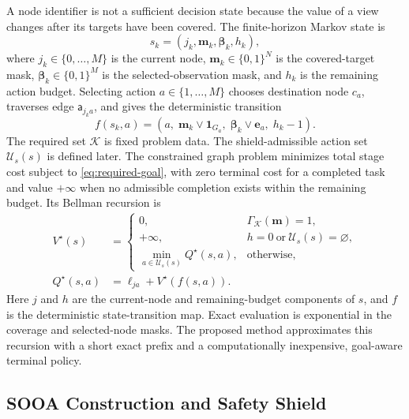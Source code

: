 \documentclass{IEEEtaes}
\begin{document}
A node identifier is not a sufficient decision state because the value of a view changes after its targets have been covered. The finite-horizon Markov state is
\begin{equation}
  s_k=(j_k,\mathbf m_k,\boldsymbol\beta_k,h_k),
  \label{eq:mdp-state}
\end{equation}
where $j_k\in\{0,\ldots,M\}$ is the current node, $\mathbf m_k\in\{0,1\}^{N}$ is the covered-target mask, $\boldsymbol\beta_k\in\{0,1\}^{M}$ is the selected-observation mask, and $h_k$ is the remaining action budget. Selecting action $a\in\{1,\ldots,M\}$ chooses destination node $c_a$, traverses edge $\mathsf a_{j_ka}$, and gives the deterministic transition
\begin{equation}
  f(s_k,a)=\left(a,\;\mathbf m_k\lor\mathbf 1_{G_a},\;\boldsymbol\beta_k\lor\mathbf e_a,\;h_k-1\right).
  \label{eq:mdp-transition}
\end{equation}
The required set $\mathcal K$ is fixed problem data. The shield-admissible action set $\mathcal U_s(s)$ is defined later. The constrained graph problem minimizes total stage cost subject to \eqref{eq:required-goal}, with zero terminal cost for a completed task and value $+\infty$ when no admissible completion exists within the remaining budget. Its Bellman recursion is
\begin{equation}
  \begin{aligned}
  V^\star(s)&=
    \begin{cases}
    0, & \Gamma_{\mathcal K}(\mathbf m)=1,\\
    +\infty, & h=0\ \text{or}\ \mathcal U_s(s)=\varnothing,\\
    \min\limits_{a\in\mathcal U_s(s)}
      Q^\star(s,a), & \text{otherwise},
    \end{cases}\\
  Q^\star(s,a)&=\ell_{ja}+V^\star(f(s,a)).
  \end{aligned}
  \label{eq:bellman}
\end{equation}
Here $j$ and $h$ are the current-node and remaining-budget components of $s$, and $f$ is the deterministic state-transition map. Exact evaluation is exponential in the coverage and selected-node masks. The proposed method approximates this recursion with a short exact prefix and a computationally inexpensive, goal-aware terminal policy.

\subsection{SOOA Construction and Safety Shield}
\end{document}
